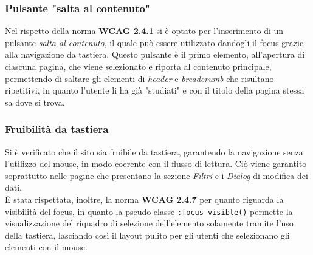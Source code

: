 \documentclass[a4paper,10pt]{article}
\begin{document}
	\subsubsection{Pulsante "salta al contenuto"}
	Nel rispetto della norma \textbf{WCAG 2.4.1} si è optato per l'inserimento di un pulsante \textit{salta al contenuto}, il quale può essere utilizzato dandogli il focus grazie alla navigazione da tastiera. Questo pulsante è il primo elemento, all'apertura di ciascuna pagina, che viene selezionato e riporta al contenuto principale, permettendo di saltare gli elementi di \textit{header} e \textit{breadcrumb} che risultano ripetitivi, in quanto l'utente li ha già "studiati" e con il titolo della pagina stessa sa dove si trova.
	
	\subsubsection{Fruibilità da tastiera}
	Si è verificato che il sito sia fruibile da tastiera, garantendo la navigazione senza l'utilizzo del mouse, in modo coerente con il flusso di lettura. Ciò viene garantito soprattutto nelle pagine che presentano la sezione \textit{Filtri} e i \textit{Dialog} di modifica dei dati.\\
	È stata rispettata, inoltre, la norma \textbf{WCAG 2.4.7} per quanto riguarda la visibilità del focus, in quanto la pseudo-classe \texttt{:focus-visible()} permette la visualizzazione del riquadro di selezione dell'elemento solamente tramite l'uso della tastiera, lasciando così il layout pulito per gli utenti che selezionano gli elementi con il mouse.
	
\end{document}
